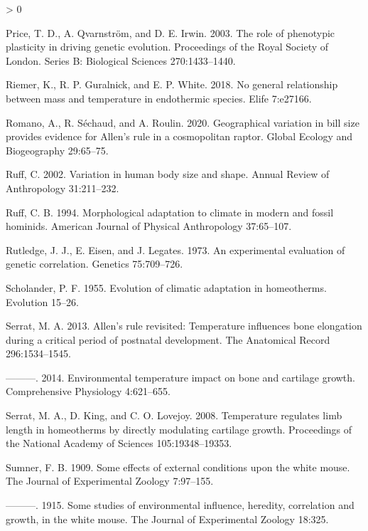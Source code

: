 \documentclass[
]{article}
\newlength{\cslhangindent}
\newenvironment{CSLReferences}[2] %
 {%
  \setlength{\parindent}{0pt}
  \ifodd #1 \everypar{\setlength{\hangindent}{\cslhangindent}}\ignorespaces\fi
  \ifnum #2 > 0
  \setlength{\parskip}{#2\baselineskip}
  \fi
 }%
 {}
\begin{document}
\begin{CSLReferences}{0}{0}
\leavevmode\hypertarget{ref-Price2003}{}%
Price, T. D., A. Qvarnström, and D. E. Irwin. 2003. The role of
phenotypic plasticity in driving genetic evolution. Proceedings of the
Royal Society of London. Series B: Biological Sciences 270:1433--1440.

\leavevmode\hypertarget{ref-Riemer2018}{}%
Riemer, K., R. P. Guralnick, and E. P. White. 2018. No general
relationship between mass and temperature in endothermic species. Elife
7:e27166.

\leavevmode\hypertarget{ref-Romano2020}{}%
Romano, A., R. Séchaud, and A. Roulin. 2020. Geographical variation in
bill size provides evidence for {Allen's} rule in a cosmopolitan raptor.
Global Ecology and Biogeography 29:65--75.

\leavevmode\hypertarget{ref-Ruff2002}{}%
Ruff, C. 2002. Variation in human body size and shape. Annual Review of
Anthropology 31:211--232.

\leavevmode\hypertarget{ref-Ruff1994}{}%
Ruff, C. B. 1994. Morphological adaptation to climate in modern and
fossil hominids. American Journal of Physical Anthropology 37:65--107.

\leavevmode\hypertarget{ref-Rutledge1973}{}%
Rutledge, J. J., E. Eisen, and J. Legates. 1973. An experimental
evaluation of genetic correlation. Genetics 75:709--726.

\leavevmode\hypertarget{ref-Scholander1955}{}%
Scholander, P. F. 1955. Evolution of climatic adaptation in homeotherms.
Evolution 15--26.

\leavevmode\hypertarget{ref-Serrat2013}{}%
Serrat, M. A. 2013. Allen's rule revisited: Temperature influences bone
elongation during a critical period of postnatal development. The
Anatomical Record 296:1534--1545.

\leavevmode\hypertarget{ref-Serrat2014}{}%
---------. 2014. Environmental temperature impact on bone and cartilage
growth. Comprehensive Physiology 4:621--655.

\leavevmode\hypertarget{ref-Serrat2008}{}%
Serrat, M. A., D. King, and C. O. Lovejoy. 2008. Temperature regulates
limb length in homeotherms by directly modulating cartilage growth.
Proceedings of the National Academy of Sciences 105:19348--19353.

\leavevmode\hypertarget{ref-Sumner1909}{}%
Sumner, F. B. 1909. Some effects of external conditions upon the white
mouse. The Journal of Experimental Zoology 7:97--155.

\leavevmode\hypertarget{ref-Sumner1915}{}%
---------. 1915. Some studies of environmental influence, heredity,
correlation and growth, in the white mouse. The Journal of Experimental
Zoology 18:325.


\end{CSLReferences}
\end{document}
